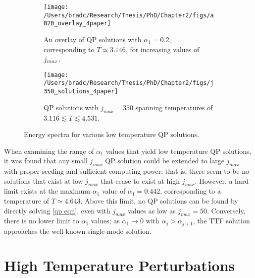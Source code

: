 \documentclass[../PhD.tex]{subfiles}
\begin{document}
\begin{figure}[ht]
	\centering
	\begin{subfigure}[t]{0.47\textwidth}
		\texttt{[image: /Users/bradc/Research/Thesis/PhD/Chapter2/figs/a020\_overlay\_4paper]}
		\caption[The smooth continuation of a low temperature QP solution from $\jm = 50$ to $\jm = 500$]{An overlay of QP solutions with $\alpha_1 = 0.2$, corresponding to $T \simeq 3.146$, for increasing values of $j_{max}$.}
		\label{fig: a0.2solns}
	\end{subfigure}
	\hfill
	\begin{subfigure}[t]{0.47\textwidth}
		\texttt{[image: /Users/bradc/Research/Thesis/PhD/Chapter2/figs/j350\_solutions\_4paper]}
		\caption{QP solutions with ${j_{max} = 350}$ spanning temperatures of ${3.116 \lesssim T \lesssim 4.531}$.}
		\label{fig: j350 solutions}
	\end{subfigure}
	\caption[Energy spectra for various low-$T$ QP solutions]{Energy spectra for various low temperature QP solutions.}
\end{figure}

When examining the range of $\alpha_1$ values that yield low temperature QP solutions, it was found that any small $j_{max}$ QP solution could be extended to large $j_{max}$ with proper seeding and sufficient computing power; that is, there seem to be no solutions that exist at low $j_{max}$ that cease to exist at high $j_{max}$. However, a hard limit exists at the maximum $\alpha_1$ value of $\alpha_1=0.442$, corresponding to a temperature of $T \simeq 4.643$. Above this limit, no QP solutions can be found by directly solving \eqref{qp eqn}, even with $j_{max}$ values as low as $j_{max}=50$. Conversely, there is no lower limit to $\alpha_1$ values; as $\alpha_1 \to 0$ with $\alpha_j > \alpha_{j+1}$, the TTF solution approaches the well-known single-mode solution.


\section{High Temperature Perturbations}
\label{ssec: highT}
\end{document}
